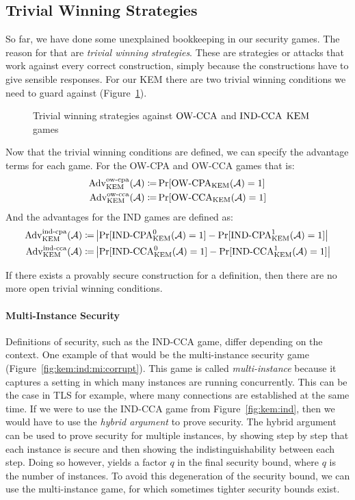 \subsection{Trivial Winning Strategies}
So far, we have done some unexplained bookkeeping in our security games. The reason for that are \emph{trivial winning strategies}.
These are strategies or attacks that work against every correct construction, simply because the constructions have to give sensible responses.
For our KEM there are two trivial winning conditions we need to guard against (Figure~\ref{kem:triv}).

\begin{figure}[!ht]%
    \centering
    
    \caption{Trivial winning strategies against ${\mathrm{OW}\text{-}\mathrm{CCA}}$ and ${\mathrm{IND}\text{-}\mathrm{CCA}}$ $\mathrm{KEM}$ games}
    \label{kem:triv}
\end{figure}

Now that the trivial winning conditions are defined, we can specify the advantage terms for each game.
For the OW-CPA and OW-CCA games that is:
\begin{align*}
    \mathrm{Adv}_{\mathrm{KEM}}^{\mathrm{ow}\text{-}\mathrm{cpa}}(\mathcal{A})\coloneqq&\Pr[{\mathrm{OW}\text{-}\mathrm{CPA}}_{\mathrm{KEM}}(\mathcal{A})=1]\\
    \mathrm{Adv}_{\mathrm{KEM}}^{\mathrm{ow}\text{-}\mathrm{cca}}(\mathcal{A})\coloneqq&\Pr[{\mathrm{OW}\text{-}\mathrm{CCA}}_{\mathrm{KEM}}(\mathcal{A})=1]
\end{align*}
And the advantages for the IND games are defined as:
\begin{align*}
    \mathrm{Adv}_{\mathrm{KEM}}^{\mathrm{ind}\text{-}\mathrm{cpa}}(\mathcal{A})\coloneqq&\left|\Pr[{\mathrm{IND}\text{-}\mathrm{CPA}}_{\mathrm{KEM}}^0(\mathcal{A})=1]-\Pr[{\mathrm{IND}\text{-}\mathrm{CPA}}_{\mathrm{KEM}}^1(\mathcal{A})=1]\right|\\
    \mathrm{Adv}_{\mathrm{KEM}}^{\mathrm{ind}\text{-}\mathrm{cca}}(\mathcal{A})\coloneqq&\left|\Pr[{\mathrm{IND}\text{-}\mathrm{CCA}}_{\mathrm{KEM}}^0(\mathcal{A})=1]-\Pr[{\mathrm{IND}\text{-}\mathrm{CCA}}_{\mathrm{KEM}}^1(\mathcal{A})=1]\right|
\end{align*}

If there exists a provably secure construction for a definition, then there are no more open trivial winning conditions.

\paragraph{Multi-Instance Security}
Definitions of security, such as the IND-CCA game, differ depending on the context.
One example of that would be the multi-instance security game (Figure~\ref{fig:kem:ind:mi:corrupt}).
This game is called \emph{multi-instance} because it captures a setting in which many instances are running concurrently.
This can be the case in TLS for example, where many connections are established at the same time.
If we were to use the IND-CCA game from Figure~\ref{fig:kem:ind}, then we would have to use the \emph{hybrid argument} to prove security.
The hybrid argument can be used to prove security for multiple instances, by showing step by step that each instance is secure and then showing the indistinguishability between each step.
Doing so however, yields a factor $q$ in the final security bound, where $q$ is the number of instances.
To avoid this degeneration of the security bound, we can use the multi-instance game, for which sometimes tighter security bounds exist.

